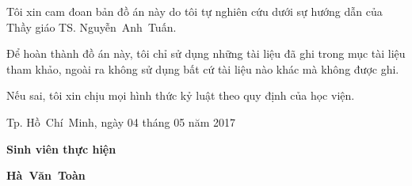 \begin{commitments}
Tôi xin cam đoan bản đồ án này do tôi tự nghiên cứu dưới sự hướng dẫn của Thầy giáo TS. Nguyễn~Anh~Tuấn.


Để hoàn thành đồ án này, tôi chỉ sử dụng những tài liệu đã ghi trong mục tài liệu tham khảo, ngoài ra không sử dụng bất cứ tài liệu nào khác mà không được ghi.


Nếu sai, tôi xin chịu mọi hình thức kỷ luật theo quy định của học viện.

\begin{flushright}
    Tp. Hồ~Chí~Minh, ngày 04 tháng 05 năm 2017

    {\textbf{Sinh viên thực hiện}\hspace*{1.25cm}\par}
    \vspace*{3.5cm}
    \textbf{Hà~Văn~Toàn}\hspace*{2cm}
\end{flushright}
\end{commitments}
  